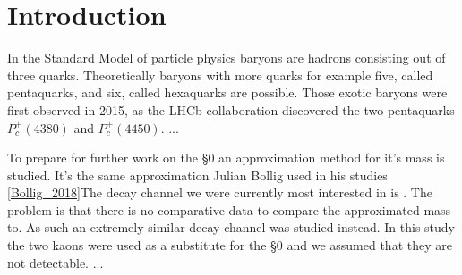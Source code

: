\section{Introduction}
\noindent
In the Standard Model of particle physics baryons are hadrons consisting out of three quarks. Theoretically baryons with more quarks for example five, called pentaquarks, and six, called hexaquarks are possible. Those exotic baryons were first observed in 2015, as the LHCb collaboration discovered the two pentaquarks $P^+_c(4380)$ and $P^+_c(4450)$\cite{PhysRevLett.115.072001}. 
...

To prepare for further work on the \S0 an approximation method for it's mass is studied. It's the same approximation Julian Bollig used in his studies \ref{Bollig_2018}The decay channel we were currently most interested in is \HexaDecay. The problem is that there is no comparative data to compare the approximated mass to. As such an extremely similar decay channel \XibmDecay was studied instead. In this study the two kaons were used as a substitute for the \S0 and we assumed that they are not detectable. 
... 